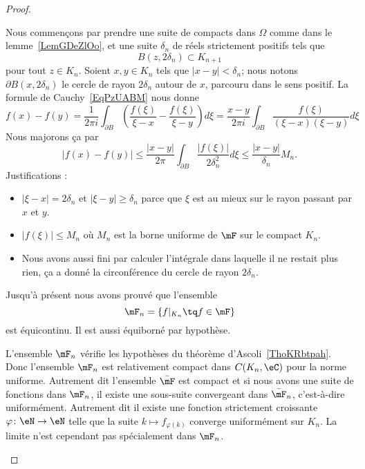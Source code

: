 \begin{proof}

	\begin{subproof}

		Nous commençons par prendre une suite de compacts dans \( \Omega\) comme dans le lemme~\ref{LemGDeZlOo}, et une suite \( \delta_n\) de réels strictement positifs tels que
		\begin{equation}
			B(z,2\delta_n)\subset K_{n+1}
		\end{equation}
		pour tout \( z\in K_n\). Soient \( x,y\in K_n\) tels que \( | x-y |<\delta_n\); nous notons \( \partial B(x,2\delta_n)\) le cercle de rayon \( 2\delta_n\) autour de \( x\), parcouru dans le sens positif. La formule de Cauchy~\ref{EqPzUABM} nous donne
		\begin{equation}
			f(x)-f(y)=\frac{1}{ 2\pi i }\int_{\partial B}\left( \frac{ f(\xi) }{ \xi-x }-\frac{ f(\xi) }{ \xi-y } \right)d\xi
			=\frac{ x-y }{ 2\pi i }\int_{\partial B}\frac{ f(\xi) }{ (\xi-x)(\xi-y) }d\xi
		\end{equation}
		Nous majorons ça par
		\begin{equation}
			\big| f(x)-f(y) \big|\leq\frac{ | x-y | }{ 2\pi }\int_{\partial B}\frac{ | f(\xi) | }{ 2\delta_n^2 }d\xi\leq \frac{ | x-y | }{ \delta_n }M_n.
		\end{equation}
		Justifications :
		\begin{itemize}
			\item
			      \( | \xi-x |=2\delta_n\) et \( | \xi-y |\geq \delta_n\) parce que \( \xi\) est au mieux sur le rayon passant par \( x\) et \( y\).
			\item
			      \( | f(\xi) |\leq M_n\) où \( M_n\) est la borne uniforme de \( \mF\) sur le compact \( K_n\).
			\item
			      Nous avons aussi fini par calculer l'intégrale dans laquelle il ne restait plus rien, ça a donné la circonférence du cercle de rayon \( 2\delta_n\).
		\end{itemize}
		Jusqu'à présent nous avons prouvé que l'ensemble
		\begin{equation}
			\mF_n=\{ f|_{K_n}\tq f\in\mF \}
		\end{equation}
		est équicontinu. Il est aussi équiborné par hypothèse.


		L'ensemble \( \mF_n\) vérifie les hypothèses du théorème d'Ascoli~\ref{ThoKRbtpah}. Donc l'ensemble \( \mF_n\) est relativement compact dans \( C(K_n,\eC)\) pour la norme uniforme. Autrement dit l'ensemble \( \bar\mF\) est compact et si nous avons une suite de fonctions dans \( \mF_n\), il existe une sous-suite convergeant dans \( \bar\mF_n\), c'est-à-dire uniformément. Autrement dit il existe une fonction strictement croissante \( \varphi\colon \eN\to \eN\) telle que la suite \( k\mapsto f_{\varphi(k)}\) converge uniformément sur \( K_n\). La limite n'est cependant pas spécialement dans \( \mF_n\).


\end{subproof}
\end{proof}
